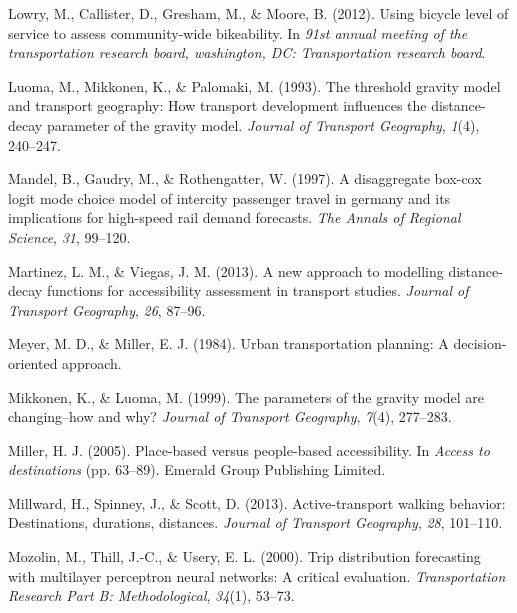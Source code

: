 \documentclass[
11pt, %
oneside, %
english, %
singlespacing, %
]{macthesis} %
\newlength{\cslhangindent}
\newenvironment{CSLReferences}[2] %
 {%
  \setlength{\parindent}{0pt}
  \ifodd #1 \everypar{\setlength{\hangindent}{\cslhangindent}}\ignorespaces\fi
  \ifnum #2 > 0
  \setlength{\parskip}{#2\baselineskip}
  \fi
 }%
 {}
\begin{document}
\begin{CSLReferences}{1}{0}
\leavevmode{}%
Lowry, M., Callister, D., Gresham, M., \& Moore, B. (2012). Using bicycle level of service to assess community-wide bikeability. In \emph{91st annual meeting of the transportation research board, washington, DC: Transportation research board}.

\leavevmode{}%
Luoma, M., Mikkonen, K., \& Palomaki, M. (1993). The threshold gravity model and transport geography: How transport development influences the distance-decay parameter of the gravity model. \emph{Journal of Transport Geography}, \emph{1}(4), 240--247.

\leavevmode{}%
Mandel, B., Gaudry, M., \& Rothengatter, W. (1997). A disaggregate box-cox logit mode choice model of intercity passenger travel in germany and its implications for high-speed rail demand forecasts. \emph{The Annals of Regional Science}, \emph{31}, 99--120.

\leavevmode{}%
Martinez, L. M., \& Viegas, J. M. (2013). A new approach to modelling distance-decay functions for accessibility assessment in transport studies. \emph{Journal of Transport Geography}, \emph{26}, 87--96.

\leavevmode{}%
Meyer, M. D., \& Miller, E. J. (1984). Urban transportation planning: A decision-oriented approach.

\leavevmode{}%
Mikkonen, K., \& Luoma, M. (1999). The parameters of the gravity model are changing--how and why? \emph{Journal of Transport Geography}, \emph{7}(4), 277--283.

\leavevmode{}%
Miller, H. J. (2005). Place-based versus people-based accessibility. In \emph{Access to destinations} (pp. 63--89). Emerald Group Publishing Limited.

\leavevmode{}%
Millward, H., Spinney, J., \& Scott, D. (2013). Active-transport walking behavior: Destinations, durations, distances. \emph{Journal of Transport Geography}, \emph{28}, 101--110.

\leavevmode{}%
Mozolin, M., Thill, J.-C., \& Usery, E. L. (2000). Trip distribution forecasting with multilayer perceptron neural networks: A critical evaluation. \emph{Transportation Research Part B: Methodological}, \emph{34}(1), 53--73.


\end{CSLReferences}
\end{document}
